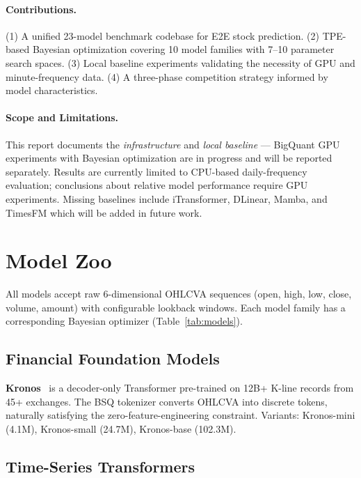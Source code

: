 \documentclass[sigconf,10pt]{acmart}
\begin{document}
\paragraph{Contributions.} (1) A unified 23-model benchmark codebase for E2E stock prediction. (2) TPE-based Bayesian optimization covering 10 model families with 7--10 parameter search spaces. (3) Local baseline experiments validating the necessity of GPU and minute-frequency data. (4) A three-phase competition strategy informed by model characteristics.

\paragraph{Scope and Limitations.} This report documents the \emph{infrastructure} and \emph{local baseline} — BigQuant GPU experiments with Bayesian optimization are in progress and will be reported separately. Results are currently limited to CPU-based daily-frequency evaluation; conclusions about relative model performance require GPU experiments. Missing baselines include iTransformer, DLinear, Mamba, and TimesFM which will be added in future work.

\section{Model Zoo}

All models accept raw 6-dimensional OHLCVA sequences (open, high, low, close, volume, amount) with configurable lookback windows. Each model family has a corresponding Bayesian optimizer (Table~\ref{tab:models}).

\subsection{Financial Foundation Models}

\textbf{Kronos}~\cite{kronos2025} is a decoder-only Transformer pre-trained on 12B+ K-line records from 45+ exchanges. The BSQ tokenizer converts OHLCVA into discrete tokens, naturally satisfying the zero-feature-engineering constraint. Variants: Kronos-mini (4.1M), Kronos-small (24.7M), Kronos-base (102.3M).

\subsection{Time-Series Transformers}
\end{document}
